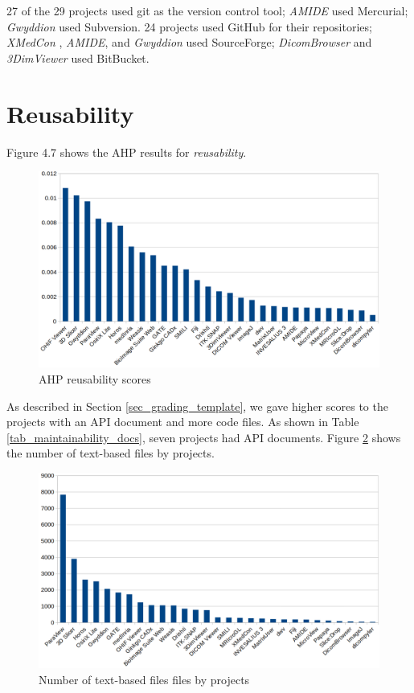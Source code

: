 27 of the 29 projects used git as the version control tool; \textit{AMIDE} used Mercurial; \textit{Gwyddion} used Subversion. 24 projects used GitHub for their repositories; \textit{XMedCon
}, \textit{AMIDE}, and \textit{Gwyddion} used SourceForge; \textit{DicomBrowser} and \textit{3DimViewer} used BitBucket.

\section{Reusability}
Figure 4.7 shows the AHP results for \textit{reusability}.

\begin{figure}[H]
\includegraphics[scale=0.38]{figures/reusability_scores.png}
\caption{AHP reusability scores}
\label{fg_reusability_scores}
\end{figure}

As described in Section \ref{sec_grading_template}, we gave higher scores to the projects with an API document and more code files. As shown in Table \ref{tab_maintainability_docs}, seven projects had API documents. Figure \ref{fg_num_text_files} shows the number of text-based files by projects.

\begin{figure}[H]
\includegraphics[scale=0.38]{figures/num_text_files.png}
\caption{Number of text-based files files by projects}
\label{fg_num_text_files}
\end{figure}

